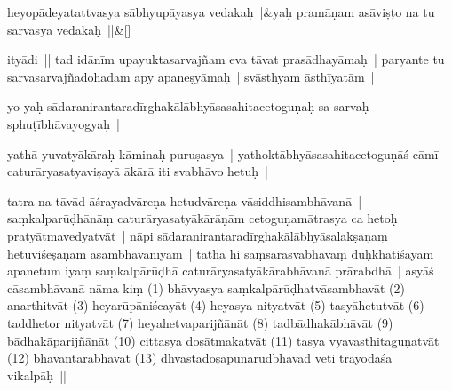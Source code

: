\documentclass[article,12pt,a4paper]{memoir}%
\newcounter{parCount}
\begin{document}
	    
	    \stanza[\smallbreak]
	  heyopādeyatattvasya sābhyupāyasya vedakaḥ |&yaḥ pramāṇam asāviṣṭo na tu sarvasya vedakaḥ ||\&[\smallbreak]
	  
	  
	  

	  \pstart \leavevmode%
	ityādi || tad idānīm upayuktasarvajñam eva tāvat prasādhayāmaḥ | paryante tu sarvasarvajñadohadam apy apaneṣyāmaḥ | svāsthyam āsthīyatām | 
	{}
	\pend%
      

	  \pstart \leavevmode%
	\label{thakur75-1.20}yo yaḥ sādaranirantaradīrghakālābhyāsasahitacetoguṇaḥ sa sarvaḥ sphuṭībhāvayogyaḥ | 
	{}
	\pend%
      

	  \pstart \leavevmode%
	yathā yuvatyākāraḥ kāminaḥ puruṣasya | yathoktābhyāsasahitacetoguṇāś cāmī caturāryasatyaviṣayā ākārā iti svabhāvo hetuḥ | 
	{}
	\pend%
      

	  \pstart \leavevmode%
	\label{thakur75-1.23}tatra na tāvād āśrayadvāreṇa hetudvāreṇa vāsiddhisambhāvanā | saṃkalparūḍhānāṃ caturāryasatyākārāṇām \label{ratnakīrtinibandhāvali__36r1PF7IMWZB49IEX1VY8ZG8MD3}cetoguṇa\label{ratnakīrtinibandhāvali__36r1PF7IMWZ43B0FVQSP9MJDYEH}mātrasya ca hetoḥ pratyātmavedyatvāt | nāpi sādaranirantaradīrghakālābhyāsalakṣaṇaṃ hetuviśeṣaṇam asambhāvanīyam | tathā hi saṃsārasvabhāvaṃ duḥkhātiśayam apanetum iyaṃ saṃkalpārūḍhā caturāryasatyākārabhāvanā prārabdhā | asyāś cāsambhāvanā nāma kiṃ (1) bhāvyasya saṃkalpārūḍhatvāsambhavāt (2) anarthitvāt (3) heyarūpāniścayāt (4) heyasya nityatvāt (5) tasyāhetutvāt (6) taddhetor nityatvāt (7) heyahetvaparijñānāt (8) tadbādhakābhāvāt (9) bādhakāparijñānāt (10) cittasya doṣātmakatvāt (11) tasya vyavasthitaguṇatvāt (12) bhavāntarābhāvāt (13) dhvastadoṣapunarudbhavād veti trayodaśa vikalpāḥ ||
	{}
	\pend%
      
\end{document}
